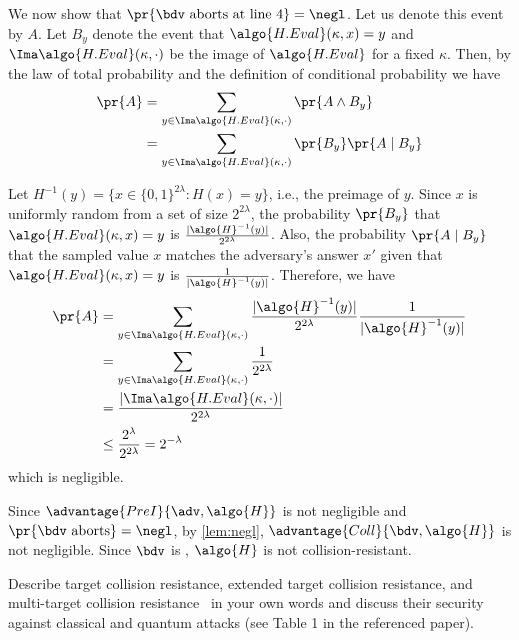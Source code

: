 \begin{mysolution}
  We now show that $\pr{\bdv \text{ aborts at line 4} } = \negl$.
  Let us denote this event by $A$.
  Let $B_y$ denote the event that $\algo{H.Eval}(\kappa, x) = y$ and $\Ima \algo{H.Eval}(\kappa, \cdot)$ be the image of $\algo{H.Eval}$ for a fixed $\kappa$.
  Then, by the law of total probability and the definition of conditional probability we have
  \begin{align*}
    \pr{A} &= \sum_{y \in \Ima \algo{H.Eval}(\kappa, \cdot)} \pr{A \wedge B_y} \\
           &= \sum_{y \in \Ima \algo{H.Eval}(\kappa, \cdot)} \pr{B_y} \pr{A \mid B_y}
  \end{align*}
  
  Let $H^{-1}(y) = \{x \in \{0, 1\}^{2\lambda} : H(x) = y\}$, i.e., the preimage of $y$.
  Since $x$ is uniformly random from a set of size $2^{2\lambda}$, the probability $\pr{B_y}$ that $\algo{H.Eval}(\kappa, x) = y$ is $\frac{|\algo{H}^{-1}(y)|} {2^{2\lambda}}$.
  Also, the probability $\pr{A \mid B_y}$ that the sampled value $x$ matches the adversary's answer $x'$ given that $\algo{H.Eval}(\kappa, x) = y$ is $\frac{1}{|\algo{H}^{-1}(y)|}$.
  Therefore, we have
  \begin{align*}
    \pr{A} &= \sum_{y \in \Ima \algo{H.Eval}(\kappa, \cdot)} \frac{|\algo{H}^{-1}(y)|} {2^{2\lambda}} \frac{1}{|\algo{H}^{-1}(y)|}  \\
           &= \sum_{y \in \Ima \algo{H.Eval}(\kappa, \cdot)} \frac{1} {2^{2\lambda}} \\
           &= \frac{|\Ima \algo{H.Eval}(\kappa, \cdot)|} {2^{2\lambda}} \\
           &\le \frac{2^{\lambda}}{2^{2\lambda}} = 2^{-\lambda} \\
  \end{align*}
  which is negligible.
  
  Since $\advantage{PreI}{\adv, \algo{H}}$ is not negligible and $\pr{\bdv \text{ aborts}} = \negl$, by \cref{lem:negl}, $\advantage{Coll}{\bdv, \algo{H}}$ is not negligible.
  Since $\bdv$ is \ppt, $\algo{H}$ is not collision-resistant.
\end{mysolution}
\fi

\begin{exercise}[Optional]
  Describe target collision resistance, extended target collision resistance, and multi-target collision resistance~\cite{PKC:HulRijSon16} in your own words and discuss their security against classical and quantum attacks (see Table 1 in the referenced paper).
\end{exercise}

